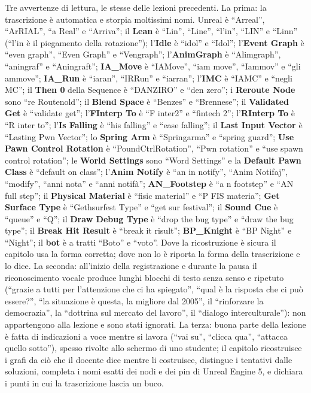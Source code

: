 Tre avvertenze di lettura, le stesse delle lezioni precedenti. La prima: la trascrizione
è automatica e storpia moltissimi nomi. Unreal è ``Arreal'', ``ArRIAL'', ``a Real'' e
``Arriva''; il \textbf{Lean} è ``Lin'', ``Line'', ``l'in'', ``LIN'' e ``Linn'' (``l'in è il
piegamento della rotazione''); l'\textbf{Idle} è ``idol'' e ``Idol''; l'\textbf{Event
Graph} è ``even graph'', ``Even Graph'' e ``Vengraph''; l'\textbf{AnimGraph} è
``Alimgraph'', ``aningraf'' e ``Aningraft''; \textbf{IA\_Move} è ``IAMove'', ``iam
move'', ``Iammov'' e ``gli ammove''; \textbf{IA\_Run} è ``iaran'', ``IRRun'' e ``iarran'';
l'\textbf{IMC} è ``IAMC'' e ``negli MC''; il \textbf{Then 0} della Sequence è
``DANZIRO'' e ``den zero''; i \textbf{Reroute Node} sono ``re Routenold''; il
\textbf{Blend Space} è ``Benzes'' e ``Brennese''; il \textbf{Validated Get} è ``validate
get''; l'\textbf{FInterp To} è ``F inter2'' e ``fintech 2''; l'\textbf{RInterp To} è ``R
inter to''; l'\textbf{Is Falling} è ``his falling'' e ``ease falling''; il \textbf{Last
Input Vector} è ``Lasting Pwn Vector''; lo \textbf{Spring Arm} è ``Springarma'' e
``spring guard''; \textbf{Use Pawn Control Rotation} è ``PoundCtrlRotation'', ``Pwn
rotation'' e ``use spawn control rotation''; le \textbf{World Settings} sono ``Word
Settings'' e la \textbf{Default Pawn Class} è ``default on class''; l'\textbf{Anim
Notify} è ``an in notify'', ``Anim Notifaj'', ``modify'', ``anni nota'' e ``anni
notifà''; \textbf{AN\_Footstep} è ``a n footstep'' e ``AN full step''; il
\textbf{Physical Material} è ``fisic material'' e ``P FIS materia''; \textbf{Get Surface
Type} è ``Gethsurfest Type'' e ``get sur festival''; il \textbf{Sound Cue} è ``queue'' e
``Q''; il \textbf{Draw Debug Type} è ``drop the bug type'' e ``draw the bug type''; il
\textbf{Break Hit Result} è ``break it risult''; \textbf{BP\_Knight} è ``BP Night'' e
``Night''; il \textbf{bot} è a tratti ``Boto'' e ``voto''. Dove la ricostruzione è
sicura il capitolo usa la forma corretta; dove non lo è riporta la forma della
trascrizione e lo dice. La seconda: all'inizio della registrazione e durante la pausa il
riconoscimento vocale produce lunghi blocchi di testo senza senso e ripetuto (``grazie a
tutti per l'attenzione che ci ha spiegato'', ``qual è la risposta che ci può essere?'',
``la situazione è questa, la migliore dal 2005'', il ``rinforzare la democrazia'', la
``dottrina sul mercato del lavoro'', il ``dialogo interculturale''): non appartengono
alla lezione e sono stati ignorati. La terza: buona parte della lezione è fatta di
indicazioni a voce mentre si lavora (``vai su'', ``clicca qua'', ``attacca quello
sotto''), spesso rivolte allo schermo di uno studente; il capitolo ricostruisce i grafi
da ciò che il docente dice mentre li costruisce, distingue i tentativi dalle soluzioni,
completa i nomi esatti dei nodi e dei pin di Unreal Engine 5, e dichiara i punti in cui
la trascrizione lascia un buco.

